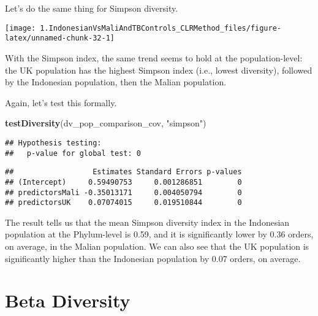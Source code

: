 \documentclass[]{article}
\newenvironment{Shaded}{\begin{snugshade}}{\end{snugshade}}
\newcommand{\DataTypeTok}[1]{\textcolor[rgb]{0.13,0.29,0.53}{#1}}
\newcommand{\KeywordTok}[1]{\textcolor[rgb]{0.13,0.29,0.53}{\textbf{#1}}}
\newcommand{\NormalTok}[1]{#1}
\newcommand{\OperatorTok}[1]{\textcolor[rgb]{0.81,0.36,0.00}{\textbf{#1}}}
\newcommand{\StringTok}[1]{\textcolor[rgb]{0.31,0.60,0.02}{#1}}
\begin{document}
Let's do the same thing for Simpson diversity.

\begin{Shaded}
\end{Shaded}

\begin{center}\texttt{[image: 1.IndonesianVsMaliAndTBControls\_CLRMethod\_files/figure-latex/unnamed-chunk-32-1]} \end{center}

With the Simpson index, the same trend seems to hold at the
population-level: the UK population has the highest Simpson index (i.e.,
lowest diversity), followed by the Indonesian population, then the
Malian population.

Again, let's test this formally.

\begin{Shaded}
\begin{Highlighting}[]
\KeywordTok{testDiversity}\NormalTok{(dv_pop_comparison_cov, }\StringTok{"simpson"}\NormalTok{)}
\end{Highlighting}
\end{Shaded}

\begin{verbatim}
## Hypothesis testing:
##   p-value for global test: 0
\end{verbatim}

\begin{verbatim}
##                  Estimates Standard Errors p-values
## (Intercept)     0.59490753     0.001286851        0
## predictorsMali -0.35013171     0.004050794        0
## predictorsUK    0.07074015     0.019510844        0
\end{verbatim}

The result tells us that the mean Simpson diversity index in the
Indonesian population at the Phylum-level is 0.59, and it is
significantly lower by 0.36 orders, on average, in the Malian
population. We can also see that the UK population is significantly
higher than the Indonesian population by 0.07 orders, on average.

\hypertarget{beta-diversity}{%
\section{Beta Diversity}\label{beta-diversity}}
\end{document}
